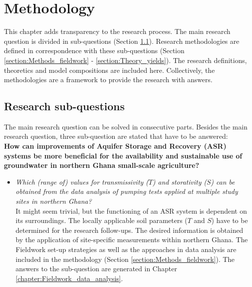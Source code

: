 \chapter{Methodology}
\label{chapter:Methods}

This chapter adds transparency to the research process. The main research question is divided in sub-questions (Section \ref{section:sub_questions}). Research methodologies are defined in correspondence with these sub-questions (Section  \ref{section:Methods_fieldwork} - \ref{section:Theory_yields}). The research definitions, theoretics and model compositions are included here. Collectively, the methodologies are a framework to provide the research with answers.

\section{Research sub-questions}
\label{section:sub_questions}

The main research question can be solved in consecutive parts. Besides the main research question, three sub-question are stated that have to be answered: \\
 
\textbf{How can improvements of Aquifer Storage and Recovery (ASR) systems be more beneficial for the availability and sustainable use of groundwater in northern Ghana small-scale agriculture?}

\begin{itemize}
\item{\textit{Which (range of) values for transmissivity ($T$) and storativity ($S$) can be obtained from the data analysis of pumping tests applied at multiple study sites in northern Ghana?}
\smallskip \\
It might seem trivial, but the functioning of an ASR system is dependent on its surroundings. The locally applicable soil parameters ($T$ and $S$) have to be determined for the research follow-ups. The desired information is obtained by the application of site-specific measurements within northern Ghana. The Fieldwork set-up strategies as well as the approaches in data analysis are included in the methodology (Section \ref{section:Methods_fieldwork}). The answers to the sub-question are generated in Chapter \ref{chapter:Fieldwork_data_analysis}.} 
\end{itemize} 

